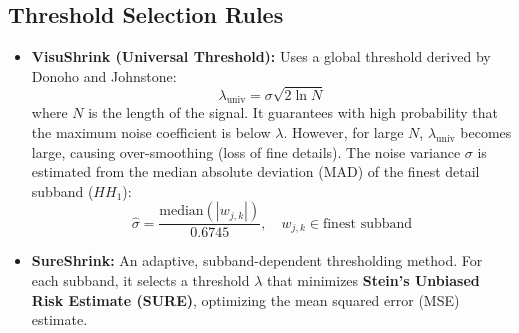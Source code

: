 \documentclass[12pt,a4paper]{article}
\begin{document}
\subsection{Threshold Selection Rules}
\begin{itemize}[leftmargin=*, itemsep=4.5pt]
  \item \textbf{VisuShrink (Universal Threshold):} Uses a global threshold derived by Donoho and Johnstone:
        $$\lambda_{\text{univ}} = \sigma \sqrt{2 \ln N}$$
        where $N$ is the length of the signal. It guarantees with high probability that the maximum noise coefficient is below $\lambda$. However, for large $N$, $\lambda_{\text{univ}}$ becomes large, causing over-smoothing (loss of fine details). The noise variance $\sigma$ is estimated from the median absolute deviation (MAD) of the finest detail subband ($HH_1$):
        $$\hat{\sigma} = \frac{\text{median}(|w_{j,k}|)}{0.6745}, \quad w_{j,k} \in \text{finest subband}$$
  \item \textbf{SureShrink:} An adaptive, subband-dependent thresholding method. For each subband, it selects a threshold $\lambda$ that minimizes \textbf{Stein's Unbiased Risk Estimate (SURE)}, optimizing the mean squared error (MSE) estimate.
\end{itemize}

\begin{tcolorbox}[tikzbox, title={Wavelet-Based Denoising Process Flow}]
\centering
{}
\end{tcolorbox}
\end{document}
